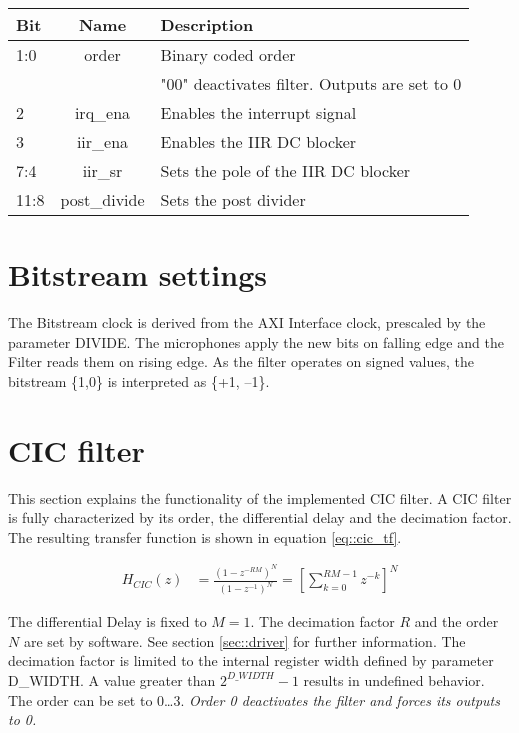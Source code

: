 \begin{table}[h]
	\centering
	\label{tbl::status_register}
	\begin{tabular}{|l|c|l|}
		\hline 
		Bit		& Name 	& Description \\
		\hline 
		1:0		& order	& Binary coded order \\
				& 		& "00" deactivates filter. Outputs are set to 0 \\
		\hline 
		2 		& irq\_ena	& Enables the interrupt signal\\
		\hline 
		3		& iir\_ena	& Enables the IIR DC blocker \\
		\hline 
		7:4		& iir\_sr	& Sets the pole of the IIR DC blocker \\
		\hline 
		11:8	& post\_divide & Sets the post divider \\
		\hline 
	\end{tabular} 
\end{table}

\section{Bitstream settings}
\label{sec::bitstream}
The Bitstream clock is derived from the AXI Interface clock, prescaled by the parameter DIVIDE.
The microphones apply the new bits on falling edge and the Filter reads them on rising edge.
As the filter operates on signed values, the bitstream \{1,0\} is interpreted as \{+1, --1\}.

\section{CIC filter}
\label{sec::cic}

This section explains the functionality of the implemented CIC filter.
A CIC filter is fully characterized by its order, the differential delay and the decimation factor.
The resulting transfer function is shown in equation \ref{eq::cic_tf}.

\begin{align}
	H_{CIC}(z) &= \frac{\left(1-z^{-RM}\right)^N}{\left(1-z^{-1}\right)^N} = \left[\sum_{k=0}^{RM-1}z^{-k}\right]^N\label{eq::cic_tf}
\end{align}

The differential Delay is fixed to $M=1$.
The decimation factor $R$ and the order $N$ are set by software.
See section \ref{sec::driver} for further information.
The decimation factor is limited to the internal register width defined by parameter D\_WIDTH.
A value greater than $2^{D\_WIDTH} - 1$ results in undefined behavior.
The order can be set to 0\ldots3.
\emph{Order 0 deactivates the filter and forces its outputs to 0.}


